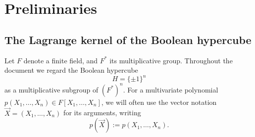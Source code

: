 \documentclass[11pt]{article}
\theoremstyle{definition}
\theoremstyle{remark}
\begin{document}
\section{Preliminaries}

\subsection{The Lagrange kernel of the Boolean hypercube}

Let $F$ denote a finite field, and $F^*$ its multiplicative group.
Throughout the document we regard the Boolean hypercube 
\[
H= \{\pm 1\}^n
\] 
as a multiplicative subgroup of  $(F^*)^n$.
For a multivariate polynomial $p(X_1,\ldots, X_n)\in F[X_1,\ldots, X_n]$, we will often use the vector notation $\vec X = (X_1,\ldots, X_n)$ for its arguments, writing 
\[
p(\vec X) := p(X_1,\ldots, X_n).
\] 

\end{document}
